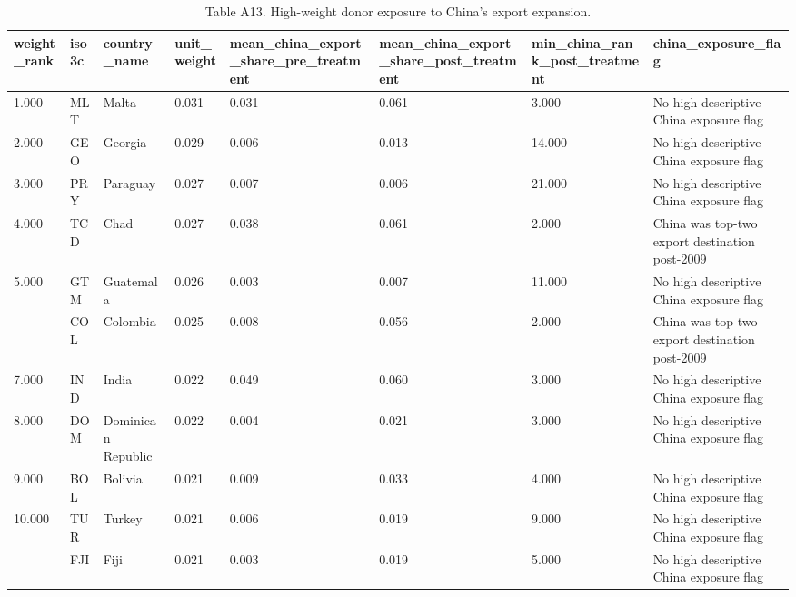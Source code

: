 \begin{table}

\caption{\label{tab:tab:sdid-china-exposure}Table A13. High-weight donor exposure to China's export expansion.}
\centering
\begin{tabular}[t]{llllllll}
\toprule
weight\_rank & iso3c & country\_name & unit\_weight & mean\_china\_export\_share\_pre\_treatment & mean\_china\_export\_share\_post\_treatment & min\_china\_rank\_post\_treatment & china\_exposure\_flag\\
\midrule
1.000 & MLT & Malta & 0.031 & 0.031 & 0.061 & 3.000 & No high descriptive China exposure flag\\
2.000 & GEO & Georgia & 0.029 & 0.006 & 0.013 & 14.000 & No high descriptive China exposure flag\\
3.000 & PRY & Paraguay & 0.027 & 0.007 & 0.006 & 21.000 & No high descriptive China exposure flag\\
4.000 & TCD & Chad & 0.027 & 0.038 & 0.061 & 2.000 & China was top-two export destination post-2009\\
5.000 & GTM & Guatemala & 0.026 & 0.003 & 0.007 & 11.000 & No high descriptive China exposure flag\\
\addlinespace
6.000 & COL & Colombia & 0.025 & 0.008 & 0.056 & 2.000 & China was top-two export destination post-2009\\
7.000 & IND & India & 0.022 & 0.049 & 0.060 & 3.000 & No high descriptive China exposure flag\\
8.000 & DOM & Dominican Republic & 0.022 & 0.004 & 0.021 & 3.000 & No high descriptive China exposure flag\\
9.000 & BOL & Bolivia & 0.021 & 0.009 & 0.033 & 4.000 & No high descriptive China exposure flag\\
10.000 & TUR & Turkey & 0.021 & 0.006 & 0.019 & 9.000 & No high descriptive China exposure flag\\
\addlinespace
11.000 & FJI & Fiji & 0.021 & 0.003 & 0.019 & 5.000 & No high descriptive China exposure flag\\
\bottomrule
\end{tabular}
\end{table}
